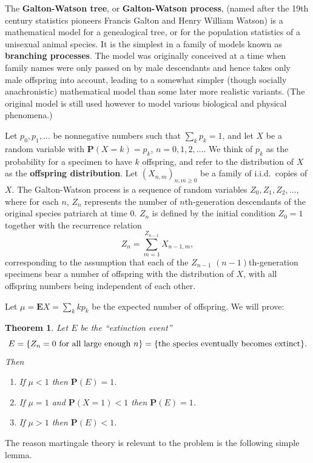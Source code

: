 \documentclass[12pt]{article}
\newtheorem{thm}{Theorem}[section]
\newcommand{\prob}{\mathbf{P}}
\newcommand{\expec}{\mathbf{E}}
\theoremstyle{example}
\begin{document}
The \textbf{Galton-Watson tree}, or \textbf{Galton-Watson process}, (named after the 19th century statistics pioneers Francis Galton and Henry William Watson) is a mathematical model for a genealogical tree, or for the population statistics of a unisexual animal species. It is the simplest in a family of models known as \textbf{branching processes}. The model was originally conceived at a time when family names were only passed on by male descendants and hence takes only male offspring into account, leading to a somewhat simpler (though socially anachronistic) mathematical model than some later more realistic variants.  (The original model is still used however to model various biological and physical phenomena.)

Let $p_0, p_1, \ldots$ be nonnegative numbers such that $\sum_k p_k = 1$, and let $X$ be a random variable with $\prob(X=k)=p_k$, $n=0,1,2,\ldots$. We think of $p_k$ as the probability for a specimen to have $k$ offspring, and refer to the distribution of $X$ as the \textbf{offspring distribution}. Let $(X_{n,m})_{n,m\ge 0}$ be a family of i.i.d.\ copies of $X$. The Galton-Watson process is a sequence of random variables $Z_0, Z_1, Z_2, \ldots$, where for each $n$, $Z_n$ represents the number of $n$th-generation descendants of the original species patriarch at time $0$. $Z_n$ is defined by the initial condition $Z_0=1$ together with the recurrence relation
$$ Z_n = \sum_{m=1}^{Z_{n-1}} X_{n-1,m}, $$
corresponding to the assumption that each of the $Z_{n-1}$ $(n-1)$th-generation specimens bear a number of offspring with the distribution of $X$, with all offspring numbers being independent of each other.

Let $\mu=\expec X = \sum_k k p_k$ be the expected number of offspring. We will prove:

\begin{thm} \label{thm-galton-watson}
Let $E$ be the ``extinction event''
$$ E = \{ Z_n=0 \textnormal{ for all large enough }n\} = \{ \textnormal{the species eventually becomes extinct} \}. $$
Then
\begin{enumerate}
\item If $\mu< 1$ then $\prob(E) = 1$.
\item If $\mu=1$ and $\prob(X=1)<1$ then $\prob(E)=1$.
\item If $\mu>1$ then $\prob(E)<1$.
\end{enumerate}
\end{thm}

The reason martingale theory is relevant to the problem is the following simple lemma.
\end{document}
